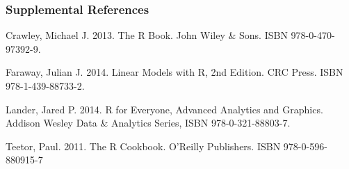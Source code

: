 \documentclass[10pt]{beamer}
\begin{document}

\begin{frame}
\frametitle{Supplemental References}
\bi
\item Crawley, Michael J.  2013.  The R Book.  John Wiley \& Sons. ISBN 978-0-470-97392-9.

\item Faraway, Julian J.  2014.  Linear Models with R, 2nd Edition.
  CRC Press. ISBN 978-1-439-88733-2.

\item Lander, Jared P.  2014.  R for Everyone, Advanced Analytics and Graphics.  Addison Wesley Data \& Analytics Series,  ISBN 978-0-321-88803-7.

\item Teetor, Paul. 2011.  The R Cookbook.  O'Reilly Publishers. ISBN
  978-0-596-880915-7

\ei

\end{frame}
\end{document}
